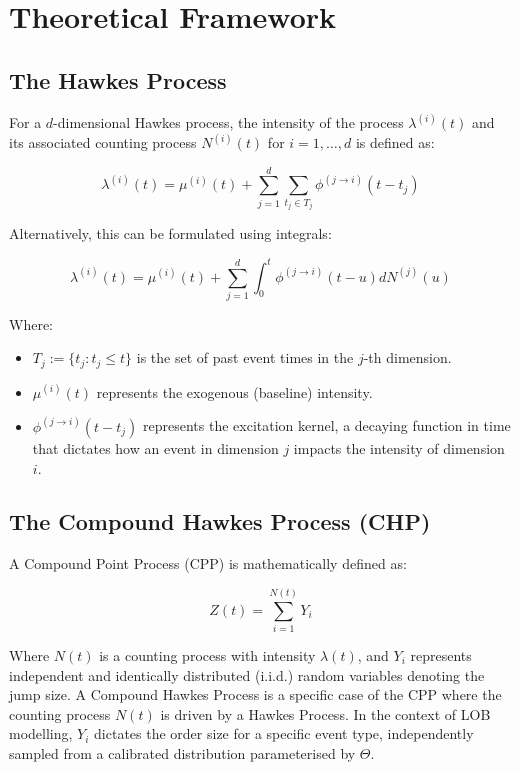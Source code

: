 \section{Theoretical Framework}

\subsection{The Hawkes Process}

For a $d$-dimensional Hawkes process, the intensity of the process $\lambda^{(i)}(t)$ and its associated counting process $N^{(i)}(t)$ for $i=1,\dots,d$ is defined as:

$$ \lambda^{(i)}(t)=\mu^{(i)}(t)+\sum_{j=1}^{d}\sum_{t_j\in T_j}\phi^{(j\rightarrow i)}(t-t_j) $$

Alternatively, this can be formulated using integrals:

$$ \lambda^{(i)}(t)=\mu^{(i)}(t)+\sum_{j=1}^{d}\int_{0}^{t}\phi^{(j\rightarrow i)}(t-u)dN^{(j)}(u) $$

Where:
\begin{itemize}
    \item $T_j := \{t_j : t_j \le t\}$ is the set of past event times in the $j$-th dimension.
    \item $\mu^{(i)}(t)$ represents the exogenous (baseline) intensity.
    \item $\phi^{(j \rightarrow i)}(t-t_j)$ represents the excitation kernel, a decaying function in time that dictates how an event in dimension $j$ impacts the intensity of dimension $i$.
\end{itemize}

\subsection{The Compound Hawkes Process (CHP)}

A Compound Point Process (CPP) is mathematically defined as:

$$ Z(t)=\sum_{i=1}^{N(t)}Y_i $$

Where $N(t)$ is a counting process with intensity $\lambda(t)$, and $Y_i$ represents independent and identically distributed (i.i.d.) random variables denoting the jump size. A Compound Hawkes Process is a specific case of the CPP where the counting process $N(t)$ is driven by a Hawkes Process. In the context of LOB modelling, $Y_i$ dictates the order size for a specific event type, independently sampled from a calibrated distribution parameterised by $\Theta$.

